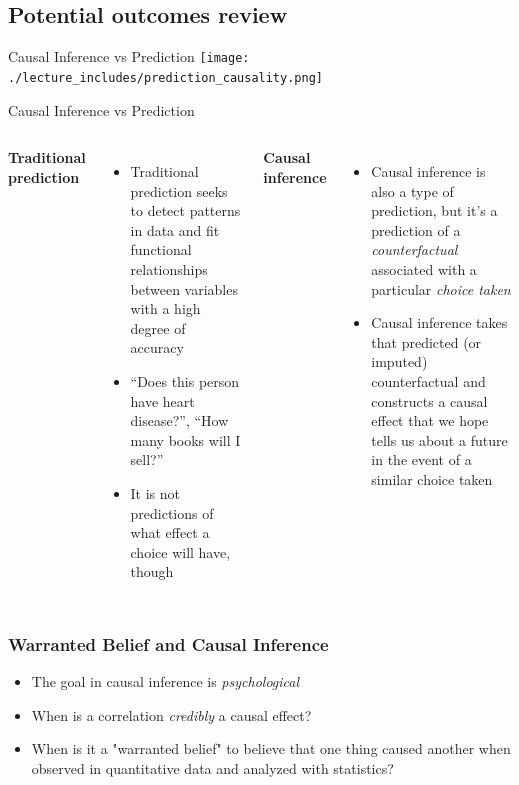 \documentclass{beamer}
\begin{document}
\subsection{Potential outcomes review}

\begin{frame}{Causal Inference vs Prediction}
  \centering
  \texttt{[image: ./lecture\_includes/prediction\_causality.png]}
\end{frame}

\begin{frame}{Causal Inference vs Prediction}

  \begin{columns}
    \centering
    \textbf{Traditional prediction}
    \begin{itemize}
      \item Traditional prediction seeks to detect patterns in data and fit functional relationships between variables with a high degree of accuracy
      \item ``Does this person have heart disease?'', ``How many books will I sell?''
      \item It is not predictions of what effect a choice will have, though
    \end{itemize}
    \centering
    \textbf{Causal inference}
    \begin{itemize}
      \item Causal inference is also a type of prediction, but it's a prediction of a \emph{counterfactual} associated with a particular \emph{choice taken}
      \item Causal inference takes that predicted (or imputed) counterfactual and constructs a causal effect that we hope tells us about a future in the event of a similar choice taken
    \end{itemize}
  \end{columns}
\end{frame}





\begin{frame}
\frametitle{Warranted Belief and Causal Inference}
\begin{itemize}
  \item The goal in causal inference is  \emph{psychological}
  \item When is a correlation \emph{credibly} a causal effect?
  \item When is it a "warranted belief" to believe that one thing caused another when observed in quantitative data and analyzed with statistics?
\end{itemize}
\end{frame}
\end{document}
